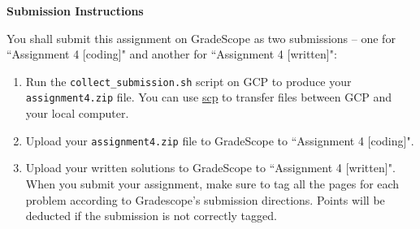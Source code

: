 \Large{\textbf{Submission Instructions}}

\normalsize
You shall submit this assignment on GradeScope as two submissions -- one for ``Assignment 4 [coding]" and another for ``Assignment 4 [written]":
\begin{enumerate}
    \item Run the \texttt{collect\_submission.sh} script on GCP to produce your \texttt{assignment4.zip} file. You can use \href{http://www.hypexr.org/linux_scp_help.php}{scp} to transfer files between GCP and your local computer.
    \item Upload your \texttt{assignment4.zip} file to GradeScope to ``Assignment 4 [coding]".
    \item Upload your written solutions to GradeScope to ``Assignment 4 [written]". When you submit your assignment, make sure to tag all the pages for each problem according to Gradescope's submission directions. Points will be deducted if the submission is not correctly tagged.
\end{enumerate}